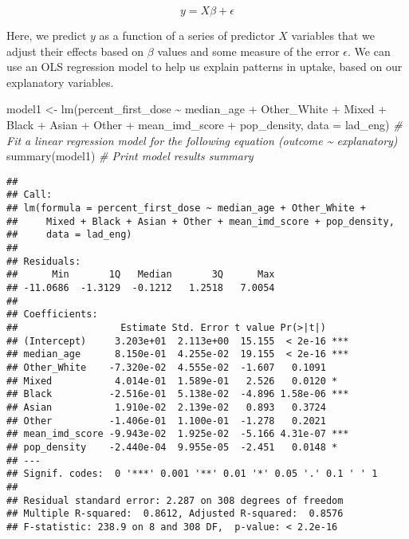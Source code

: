 \documentclass[
]{book}
\newenvironment{Shaded}{\begin{snugshade}}{\end{snugshade}}
\newcommand{\AttributeTok}[1]{\textcolor[rgb]{0.77,0.63,0.00}{#1}}
\newcommand{\CommentTok}[1]{\textcolor[rgb]{0.56,0.35,0.01}{\textit{#1}}}
\newcommand{\FunctionTok}[1]{\textcolor[rgb]{0.00,0.00,0.00}{#1}}
\newcommand{\NormalTok}[1]{#1}
\newcommand{\OtherTok}[1]{\textcolor[rgb]{0.56,0.35,0.01}{#1}}
\newcommand{\SpecialCharTok}[1]{\textcolor[rgb]{0.00,0.00,0.00}{#1}}
\begin{document}
\[
y = X\beta + \epsilon
\]

Here, we predict \(y\) as a function of a series of predictor \(X\) variables that we adjust their effects based on \(\beta\) values and some measure of the error \(\epsilon\). We can use an OLS regression model to help us explain patterns in uptake, based on our explanatory variables.

\begin{Shaded}
\begin{Highlighting}[]
\NormalTok{model1 }\OtherTok{\textless{}{-}} \FunctionTok{lm}\NormalTok{(percent\_first\_dose }\SpecialCharTok{\textasciitilde{}}\NormalTok{ median\_age }\SpecialCharTok{+}\NormalTok{ Other\_White }\SpecialCharTok{+}\NormalTok{ Mixed }\SpecialCharTok{+}\NormalTok{ Black }\SpecialCharTok{+}\NormalTok{ Asian }\SpecialCharTok{+}\NormalTok{ Other }\SpecialCharTok{+}\NormalTok{ mean\_imd\_score }\SpecialCharTok{+}\NormalTok{ pop\_density, }\AttributeTok{data =}\NormalTok{ lad\_eng) }\CommentTok{\# Fit a linear regression model for the following equation (outcome \textasciitilde{} explanatory)}
\FunctionTok{summary}\NormalTok{(model1) }\CommentTok{\# Print model results summary}
\end{Highlighting}
\end{Shaded}

\begin{verbatim}
## 
## Call:
## lm(formula = percent_first_dose ~ median_age + Other_White + 
##     Mixed + Black + Asian + Other + mean_imd_score + pop_density, 
##     data = lad_eng)
## 
## Residuals:
##      Min       1Q   Median       3Q      Max 
## -11.0686  -1.3129  -0.1212   1.2518   7.0054 
## 
## Coefficients:
##                  Estimate Std. Error t value Pr(>|t|)    
## (Intercept)     3.203e+01  2.113e+00  15.155  < 2e-16 ***
## median_age      8.150e-01  4.255e-02  19.155  < 2e-16 ***
## Other_White    -7.320e-02  4.555e-02  -1.607   0.1091    
## Mixed           4.014e-01  1.589e-01   2.526   0.0120 *  
## Black          -2.516e-01  5.138e-02  -4.896 1.58e-06 ***
## Asian           1.910e-02  2.139e-02   0.893   0.3724    
## Other          -1.406e-01  1.100e-01  -1.278   0.2021    
## mean_imd_score -9.943e-02  1.925e-02  -5.166 4.31e-07 ***
## pop_density    -2.440e-04  9.955e-05  -2.451   0.0148 *  
## ---
## Signif. codes:  0 '***' 0.001 '**' 0.01 '*' 0.05 '.' 0.1 ' ' 1
## 
## Residual standard error: 2.287 on 308 degrees of freedom
## Multiple R-squared:  0.8612, Adjusted R-squared:  0.8576 
## F-statistic: 238.9 on 8 and 308 DF,  p-value: < 2.2e-16
\end{verbatim}
\end{document}
